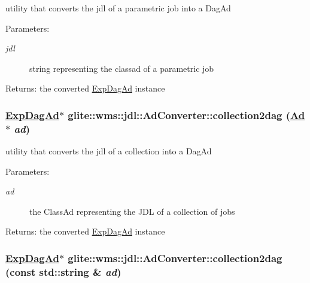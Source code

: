 utility that converts the jdl of a parametric job into a Dag\-Ad \begin{Desc}
\item[Parameters:]
\begin{description}
\item[{\em jdl}]string representing the classad of a parametric job \end{description}
\end{Desc}
\begin{Desc}
\item[Returns:]the converted \hyperlink{classglite_1_1wms_1_1jdl_1_1ExpDagAd}{Exp\-Dag\-Ad} instance\end{Desc}
\hypertarget{classglite_1_1wms_1_1jdl_1_1AdConverter_z23_3}{
\subsubsection[collection2dag]{\setlength{\rightskip}{0pt plus 5cm}\hyperlink{classglite_1_1wms_1_1jdl_1_1ExpDagAd}{Exp\-Dag\-Ad}$\ast$ glite::wms::jdl::Ad\-Converter::collection2dag (\hyperlink{classglite_1_1wms_1_1jdl_1_1Ad}{Ad} $\ast$ {\em ad})}}
\label{classglite_1_1wms_1_1jdl_1_1AdConverter_z23_3}


utility that converts the jdl of a collection into a Dag\-Ad \begin{Desc}
\item[Parameters:]
\begin{description}
\item[{\em ad}]the Class\-Ad representing the JDL of a collection of jobs \end{description}
\end{Desc}
\begin{Desc}
\item[Returns:]the converted \hyperlink{classglite_1_1wms_1_1jdl_1_1ExpDagAd}{Exp\-Dag\-Ad} instance\end{Desc}
\hypertarget{classglite_1_1wms_1_1jdl_1_1AdConverter_z23_2}{
\subsubsection[collection2dag]{\setlength{\rightskip}{0pt plus 5cm}\hyperlink{classglite_1_1wms_1_1jdl_1_1ExpDagAd}{Exp\-Dag\-Ad}$\ast$ glite::wms::jdl::Ad\-Converter::collection2dag (const std::string \& {\em ad})}}
\label{classglite_1_1wms_1_1jdl_1_1AdConverter_z23_2}


